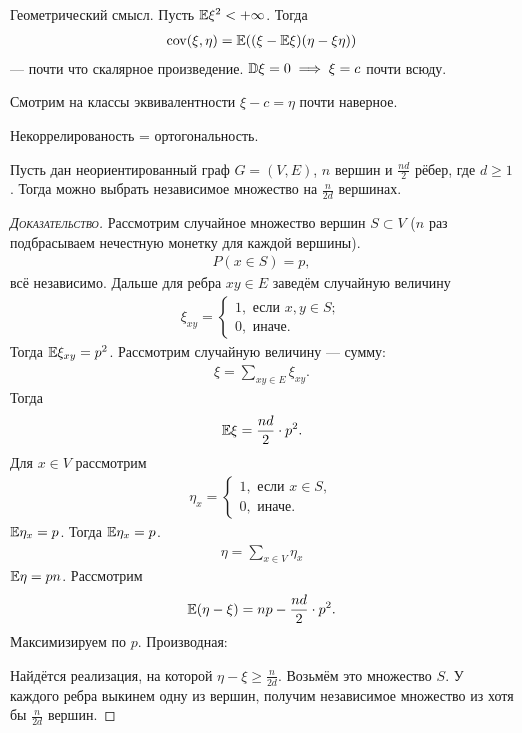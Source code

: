 \documentclass[../main.tex]{subfiles}
\begin{document}
Геометрический смысл. Пусть $ \mathbb E \xi^{2} < +\infty $. Тогда
\begin{align*}
 \mathrm{cov}(\xi,\eta) = \mathbb E((\xi - \mathbb E\xi)(\eta - \xi\eta))
\end{align*} --- почти что скалярное произведение. $ \mathbb D\xi = 0 \implies \xi = c $ почти всюду.

Смотрим на классы эквивалентности $ \xi - c = \eta$ почти наверное.

Некоррелированость = ортогональность.

\begin{exmpl}
 Пусть дан неориентированный граф $ G = (V,E) $, $ n $ вершин и $ \frac{nd}{2} $ рёбер, где $ d \geqslant 1 $. Тогда можно выбрать независимое множество на $ \frac{n}{2d} $ вершинах.
\end{exmpl}
\begin{proof}[\normalfont\textsc{Доказательство}]
 Рассмотрим случайное множество вершин $ S \subset V $ ($ n $ раз подбрасываем нечестную монетку для каждой вершины).
 \begin{align*}
  P(x \in S) = p,
 \end{align*} всё независимо. Дальше для ребра $ xy \in E $ заведём случайную величину
 \begin{align*}
  \xi_{xy} = \begin{cases}
   1, \text{ если } x, y \in S; \\
   0, \text{ иначе. }
  \end{cases} 
 \end{align*} Тогда $ \mathbb E\xi_{xy} = p^{2} $. Рассмотрим случайную величину --- сумму:
 \begin{align*}
  \xi = \sum_{xy \in E}\xi_{xy}.
 \end{align*} Тогда
 \begin{align*}
  \mathbb E\xi = \frac{nd}{2} \cdot p^{2}
 .\end{align*} Для $ x \in V $ рассмотрим
 \begin{align*}
  \eta_x = \begin{cases}
   1, \text{ если } x \in S, \\
   0, \text{ иначе. }
  \end{cases} 
 \end{align*} $ \mathbb E\eta_x = p $. Тогда $ \mathbb E\eta_x = p $.
 \begin{align*}
  \eta = \sum_{x \in V} \eta_x
 \end{align*} $ \mathbb E\eta = pn $. Рассмотрим
 \begin{align*}
  \mathbb E(\eta - \xi) = np - \frac{nd}{2} \cdot p^{2}.
 \end{align*} Максимизируем по $ p $. Производная:

 Найдётся реализация, на которой $ \eta - \xi \geqslant \frac{n}{2d} $. Возьмём это множество $ S $. У каждого ребра выкинем одну из вершин, получим независимое множество из хотя бы $ \frac{n}{2d} $ вершин.
\end{proof}
\end{document}
